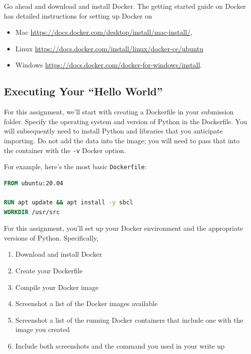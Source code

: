 \documentclass[paper=a4, fontsize=11pt]{scrartcl} %
\begin{document}
Go ahead and download and install Docker. The getting started guide on Docker has detailed instructions for setting up Docker on 
\begin{itemize}
    \item Mac \url{https://docs.docker.com/desktop/install/mac-install/},
    \item Linux \url{https://docs.docker.com/install/linux/docker-ce/ubuntu}
    \item Windows \url{https://docs.docker.com/docker-for-windows/install}.
\end{itemize}

\subsection{Executing Your ``Hello World''}

For this assignment, we'll start with creating a Dockerfile in your submission folder. Specify the operating system and version of Python in the Dockerfile. You will subsequently need to install Python and libraries that you anticipate importing. Do not add the data into the image; you will need to pass that into the container with the \verb"-v" Docker option.


For example, here's the most basic \verb"Dockerfile":

\begin{lstlisting}[language=Dockerfile]
FROM ubuntu:20.04

RUN apt update && apt install -y sbcl
WORKDIR /usr/src
\end{lstlisting}

For this assignment, you'll set up your Docker environment and the appropriate versions of Python. Specifically,

\begin{enumerate}
    \item Download and install Docker
    \item Create your Dockerfile
    \item Compile your Docker image
    \item Screenshot a list of the Docker images available
    \item Screenshot a list of the running Docker containers that include one with the image you created
    \item Include both screenshots and the command you used in your write up
\end{enumerate}
\end{document}
